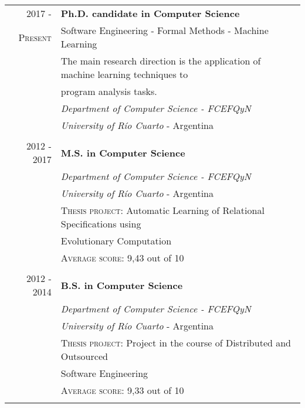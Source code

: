 \documentclass[a4paper,10pt]{article} %
\begin{document}
\begin{tabular}{rl}
\\
\textsc{2017 -}	& \textbf{Ph.D. candidate in Computer Science} \\
\textsc{Present}  & Software Engineering - Formal Methods - Machine Learning \\
& The main research direction is the application of machine learning techniques to \\ 
& program analysis tasks. \\
& \textit{Department of Computer Science - FCEFQyN} \\ & \textit{University of Río Cuarto} - Argentina \\ & \\

\textsc{2012 - 2017}	& \textbf{M.S. in Computer Science} \\
 & \textit{Department of Computer Science - FCEFQyN} \\ & \textit{University of Río Cuarto} - Argentina \\ 
& \textsc{Thesis project:} Automatic Learning of Relational Specifications using \\ & Evolutionary Computation \\ & \textsc{Average score:} 9,43 out of 10 \\ & \\

\textsc{2012 - 2014}	& \textbf{B.S. in Computer Science} \\
 					& \textit{Department of Computer Science - FCEFQyN} \\ & \textit{University of Río Cuarto} - Argentina \\
& \textsc{Thesis project:} Project in the course of Distributed and Outsourced \\ & Software Engineering \\ & \textsc{Average score:} 9,33 out of 10 \\ \\ 

\end{tabular}
\end{document}
